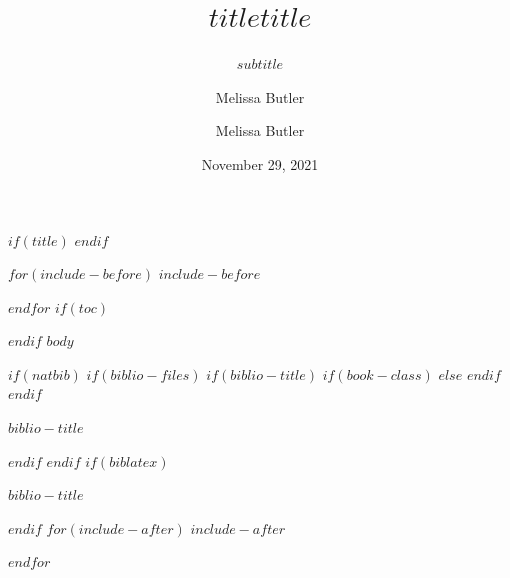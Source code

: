 \documentclass[$if(fontsize)$$fontsize$,$endif$$if(handout)$handout,$endif$$if(beamer)$ignorenonframetext,$endif$$for(classoption)$$classoption$$sep$,$endfor$]{$documentclass$}
\title[$shorttitle$]{$title$}
\title{$title$}
\subtitle{$subtitle$}
\institute[$shortinstitute$]{$institute$}
\institute{$institute$}
\author[Melissa Butler]{Melissa Butler}
\author{Melissa Butler}
\date{November 29, 2021}
\begin{document}
$if(title)$
\frame{\titlepage}
$endif$

$for(include-before)$
$include-before$

$endfor$
$if(toc)$
\begin{frame}
\tableofcontents[hideallsubsections]
\end{frame}

$endif$
$body$

$if(natbib)$
$if(biblio-files)$
$if(biblio-title)$
$if(book-class)$
\renewcommand\bibname{$biblio-title$}
$else$
\renewcommand\refname{$biblio-title$}
$endif$
$endif$
\begin{frame}[allowframebreaks]{$biblio-title$}

\end{frame}

$endif$
$endif$
$if(biblatex)$
\begin{frame}[allowframebreaks]{$biblio-title$}
\printbibliography[heading=none]
\end{frame}

$endif$
$for(include-after)$
$include-after$

$endfor$
\end{document}
